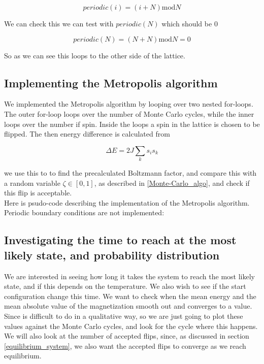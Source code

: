 \documentclass[a4paper, 10pt]{article}
\begin{document}
\begin{equation}
periodic(i) = (i + N) \text{mod} N
\end{equation} 

We can check this we can test with $periodic(N)$ which should be $0$

\begin{equation}
periodic(N) = (N + N)\text{mod} N = 0
\end{equation}

So as we can see this loops to the other side of the lattice. 



\subsection{Implementing the Metropolis algorithm}\label{metropolis_algo_implementation}
We implemented the Metropolis algorithm by looping over two nested for-loops. The outer for-loop loops over the number of Monte Carlo cycles, while the inner loops over the number if spin. Inside the loops a spin in the lattice is chosen to be flipped. The then energy difference is calculated from 

$$\Delta E = 2J\sum_k s_is_k$$

we use this to to find the precalculated Boltzmann factor, and compare this with a random variable $\zeta \in [0,1]$, as described in \ref{Monte-Carlo_algo}, and check if this flip is acceptable.\\

Here is psudo-code describing the implementation of the Metropolis algorithm. Periodic boundary conditions are not implemented:
 


\subsection{Investigating the time to reach at the most likely state, and probability distribution}

We are interested in seeing how long it takes the system to reach the most likely state, and if this depends on the temperature. We also wish to see if the start configuration change this time. We want to check when the mean energy and the mean absolute value of the magnetization smooth out and converges to a value. Since is difficult to do in a qualitative way, so we are just going to plot these values against the Monte Carlo cycles, and look for the cycle where this happens. We will also look at the number of accepted flips, since, as discussed in section \ref{equilibrium_system}, we also want the accepted flips to converge as we reach equilibrium.\\
\end{document}
